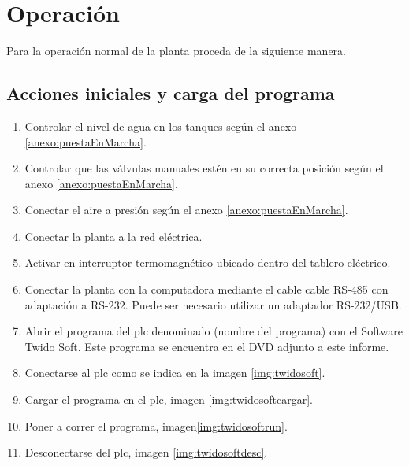 \section{Operación}
\label{anexo:operacion}

Para la operación normal de la planta proceda de la siguiente manera. 


\subsection{Acciones iniciales y carga del programa}

\begin{enumerate}
 \item Controlar el nivel de agua en los tanques según el anexo \ref{anexo:puestaEnMarcha}.
 \item Controlar que las válvulas manuales estén en su correcta
 posición según el anexo \ref{anexo:puestaEnMarcha}.
 \item Conectar el aire a presión según el anexo \ref{anexo:puestaEnMarcha}.
 \item Conectar la planta a la red eléctrica.
 \item Activar en interruptor termomagnético ubicado dentro del tablero
 eléctrico.
 \item Conectar la planta con la computadora mediante el cable cable RS-485 
 con adaptación a RS-232. Puede ser necesario utilizar un adaptador RS-232/USB.
 \item Abrir el programa del \gls{plc} denominado {\color{red}(nombre del programa)} 
 con el Software Twido Soft. Este programa se encuentra en el DVD adjunto a este 
 informe.
 \item Conectarse al \gls{plc} como se indica en la imagen \ref{img:twidosoft}.
 \item Cargar el programa en el \gls{plc}, imagen \ref{img:twidosoftcargar}.
 \item Poner a correr el programa, imagen\ref{img:twidosoftrun}.
 \item Desconectarse del \gls{plc}, imagen \ref{img:twidosoftdesc}.
\end{enumerate}


